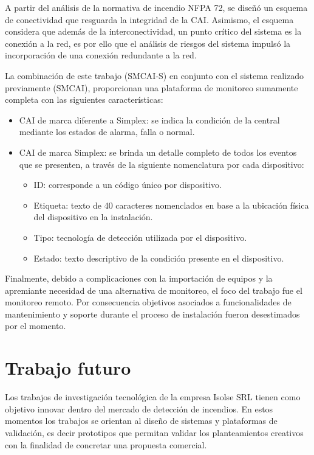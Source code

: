 A partir del análisis de la normativa de incendio NFPA 72, se diseñó un esquema de conectividad que resguarda la integridad de la CAI. Asimismo, el esquema considera que además de la interconectividad, un punto crítico del sistema es la conexión a la red, es por ello que el análisis de riesgos del sistema impulsó la incorporación de una conexión redundante a la red. 

La combinación de este trabajo (SMCAI-S) en conjunto con el sistema realizado previamente (SMCAI), proporcionan una plataforma de monitoreo sumamente completa con las siguientes características:
\begin{itemize}
\item CAI de marca diferente a Simplex: se indica la condición de la central mediante los estados de alarma, falla o normal.  
\item CAI de marca Simplex: se brinda un detalle completo de todos los eventos que se presenten, a través de la siguiente nomenclatura por cada dispositivo:
\begin{itemize}
	\item ID: corresponde a un código único por dispositivo.
	\item Etiqueta: texto de 40 caracteres nomenclados en base a la ubicación física del dispositivo en la instalación.
	\item Tipo: tecnología de detección utilizada por el dispositivo.
	\item Estado: texto descriptivo de la condición presente en el dispositivo.
\end{itemize}
\end{itemize}

Finalmente, debido a complicaciones con la importación de equipos y la apremiante necesidad de una alternativa de monitoreo, el foco del trabajo fue el monitoreo remoto. Por consecuencia objetivos asociados a funcionalidades de mantenimiento y soporte durante el proceso de instalación fueron desestimados por el momento. 



\section{Trabajo futuro}

Los trabajos de investigación tecnológica de la empresa Isolse SRL tienen como objetivo innovar dentro del mercado de detección de incendios. En estos momentos los trabajos se orientan al diseño de sistemas y plataformas de validación, es decir prototipos que permitan validar los planteamientos creativos con la finalidad de concretar una propuesta comercial.

